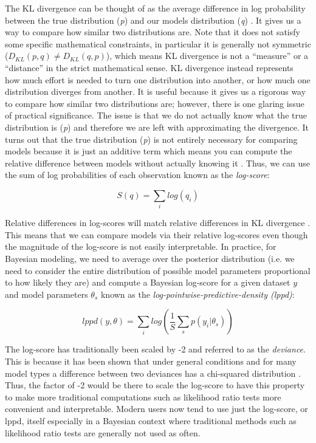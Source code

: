 The KL divergence can be thought of as the average difference in log probability between the true distribution (\textit{p}) and our models distribution (\textit{q}) \cite{McElreath2020}. It gives us a way to compare how similar two distributions are. Note that it does not satisfy some specific mathematical constraints, in particular it is generally not symmetric ($D_{KL}(p,q) \neq D_{KL}(q,p)$), which means KL divergence is not a ``measure'' or a ``distance'' in the strict mathematical sense. KL divergence instead represents how much effort is needed to turn one distribution into another, or how much one distribution diverges from another. It is useful because it gives us a rigorous way to compare how similar two distributions are; however, there is one glaring issue of practical significance. The issue is that we do not actually know what the true distribution is (\textit{p}) and therefore we are left with approximating the divergence. It turns out that the true distribution (\textit{p}) is not entirely necessary for comparing models because it is just an additive term which means you can compute the relative difference between models without actually knowing it \cite{McElreath2020}. Thus, we can use the sum of log probabilities of each observation known as the \textit{log-score}:

\begin{equation} \label{eq:log-score}
S(q) = \sum_i log(q_i)
\end{equation}

Relative differences in log-scores will match relative differences in KL divergence \cite{McElreath2020}. This means that we can compare models via their relative log-scores even though the magnitude of the log-score is not easily interpretable. In practice, for Bayesian modeling, we need to average over the posterior distribution (i.e. we need to consider the entire distribution of possible model parameters proportional to how likely they are) and compute a Bayesian log-score for a given dataset $y$ and model parameters $\theta_s$ known as the \textit{log-pointwise-predictive-density (lppd)}:

\begin{equation} \label{eq:lppd}
lppd(y, \theta) = \sum_i log \left( \frac{1}{S} \sum_s p(y_i | \theta_s) \right)
\end{equation}

The log-score has traditionally been scaled by -2 and referred to as the \textit{deviance}. This is because it has been shown that under general conditions and for many model types a difference between two deviances has a chi-squared distribution \cite{Dunn2018}. Thus, the factor of -2 would be there to scale the log-score to have this property to make more traditional computations such as likelihood ratio tests more convenient and interpretable. Modern users now tend to use just the log-score, or lppd, itself especially in a Bayesian context where traditional methods such as likelihood ratio tests are generally not used as often.

